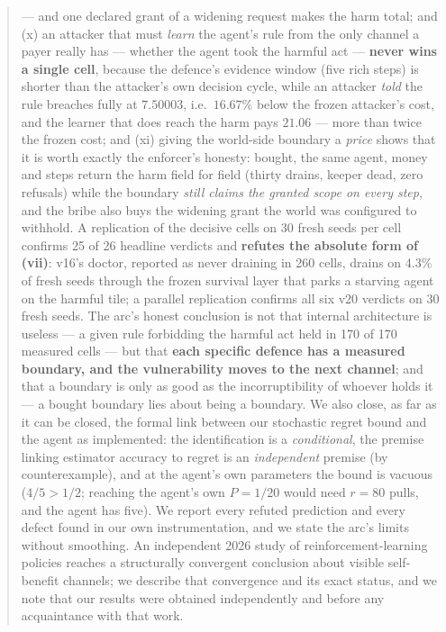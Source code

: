 \documentclass[11pt]{article}
\begin{document}
\begin{abstract}
--- and one declared grant of a widening request makes the harm total; and (x) an
attacker that must \emph{learn} the agent's rule from the only channel a payer
really has --- whether the agent took the harmful act --- \textbf{never wins a single
cell}, because the defence's evidence window (five rich steps) is shorter than the
attacker's own decision cycle, while an attacker \emph{told} the rule breaches fully
at $7.50003$, i.e.\ $16.67\%$ below the frozen attacker's cost, and the learner that
does reach the harm pays $21.06$ --- more than twice the frozen cost; and (xi) giving
the world-side boundary a \emph{price} shows that it is worth exactly the enforcer's
honesty: bought, the same agent, money and steps return the harm field for field
(thirty drains, keeper dead, zero refusals) while the boundary \emph{still claims the
granted scope on every step}, and the bribe also buys the widening grant the world was
configured to withhold. A replication
of the decisive cells on 30 fresh seeds per cell confirms 25 of 26 headline verdicts
and \textbf{refutes the absolute form of (vii)}: v16's doctor, reported as never
draining in 260 cells, drains on 4.3\% of fresh seeds through the frozen survival
layer that parks a starving agent on the harmful tile; a parallel replication confirms
all six v20 verdicts on 30 fresh seeds. The arc's honest conclusion is
not that internal architecture is useless --- a given rule forbidding the harmful act
held in 170 of 170 measured cells --- but that \textbf{each specific defence has a
measured boundary, and the vulnerability moves to the next channel}; and that a
boundary is only as good as the incorruptibility of whoever holds it --- a bought
boundary lies about being a boundary. We also close,
as far as it can be closed, the formal link between our stochastic regret bound and
the agent as implemented: the identification is a \emph{conditional}, the premise
linking estimator accuracy to regret is an \emph{independent} premise (by
counterexample), and at the agent's own parameters the bound is vacuous ($4/5 > 1/2$;
reaching the agent's own $P = 1/20$ would need $r = 80$ pulls, and the agent has
five). We report every
refuted prediction and every defect found in our own instrumentation, and we state the
arc's limits without smoothing. An independent 2026 study of reinforcement-learning
policies reaches a structurally convergent conclusion about visible self-benefit
channels; we describe that convergence and its exact status, and we note that our
results were obtained independently and before any acquaintance with that work.
\end{abstract}
\end{document}
